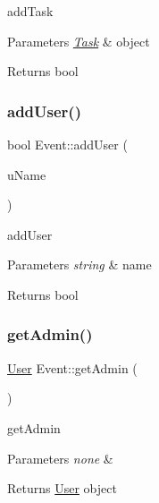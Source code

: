 add\+Task 
\begin{DoxyParams}{Parameters}
{\em \mbox{\hyperlink{class_task}{Task}}} & object \\
\hline
\end{DoxyParams}
\begin{DoxyReturn}{Returns}
bool 
\end{DoxyReturn}
\mbox{\label{class_event_ab1df9a3359b6c36e5b20fe2427815301}} 
\subsubsection{\texorpdfstring{add\+User()}{addUser()}}
{\footnotesize\ttfamily bool Event\+::add\+User (\begin{DoxyParamCaption}\item[{std\+::string}]{u\+Name }\end{DoxyParamCaption})}

add\+User 
\begin{DoxyParams}{Parameters}
{\em string} & name \\
\hline
\end{DoxyParams}
\begin{DoxyReturn}{Returns}
bool 
\end{DoxyReturn}
\mbox{\label{class_event_adabdcb711ca198d3fe079986f218b1cc}} 
\subsubsection{\texorpdfstring{get\+Admin()}{getAdmin()}}
{\footnotesize\ttfamily \mbox{\hyperlink{class_user}{User}} Event\+::get\+Admin (\begin{DoxyParamCaption}{ }\end{DoxyParamCaption})}

get\+Admin 
\begin{DoxyParams}{Parameters}
{\em none} & \\
\hline
\end{DoxyParams}
\begin{DoxyReturn}{Returns}
\mbox{\hyperlink{class_user}{User}} object 
\end{DoxyReturn}
\mbox{\label{class_event_adf0f3e50061123d6f24200661eeb66eb}} 

